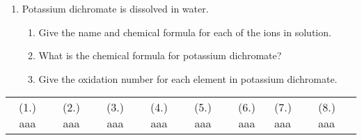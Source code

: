 \begin{eocexercises}{}
\begin{enumerate}
\item{Potassium dichromate is dissolved in water.}
\begin{enumerate}
\item{Give the name and chemical formula for each of the ions in solution.}
\item{What is the chemical formula for potassium dichromate?}
\item{Give the oxidation number for each element in potassium dichromate.}
\end{enumerate}

\end{enumerate}

\practiceinfo

\begin{tabular}[h]{cccccc}
(1.) aaa & (2.) aaa & (3.) aaa & (4.) aaa & (5.) aaa & (6.) aaa & (7.) aaa & (8.) aaa & 
 \end{tabular}
\end{eocexercises}









